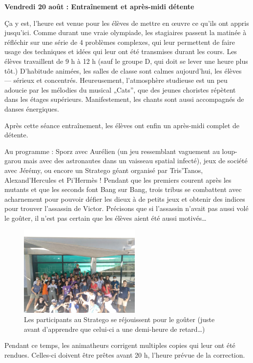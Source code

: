 \begin{center}
{\textbf{Vendredi 20 août : Entraînement et après-midi détente}}
\end{center}
\vspace{2mm}

Ça y est, l’heure est venue pour les élèves de mettre en œuvre ce qu’ils ont appris jusqu’ici. Comme durant une vraie olympiade, les stagiaires passent la matinée à réfléchir sur une série de 4 problèmes complexes, qui leur permettent de faire usage des techniques et idées qui leur ont été transmises durant les cours. Les élèves travaillent de 9 h à 12 h (sauf le groupe D, qui doit se lever une heure plus tôt.) D’habitude animées, les salles de classe sont calmes aujourd’hui, les élèves — sérieux et concentrés. Heureusement, l’atmosphère studieuse est un peu adoucie par les mélodies du musical „Cats”, que des jeunes choristes répètent dans les étages supérieurs. Manifestement, les chants sont aussi accompagnés de danses énergiques.

Après cette séance entraînement, les élèves ont enfin un après-midi complet de détente.

Au programme : Sporz avec Aurélien (un jeu ressemblant vaguement au loup-garou mais avec des astronautes dans un vaisseau spatial infecté), jeux de société avec Jérémy, ou encore un Stratego géant organisé par Tris’Tanos, Alexand’Hercules et Pi’Hermès ! Pendant que les premiers courent après les mutants et que les seconds font Bang sur Bang, trois tribus se combattent avec acharnement pour pouvoir défier les dieux à de petits jeux et obtenir des indices pour trouver l’assassin de Victor. Précisons que si l’assassin n’avait pas aussi volé le goûter, il n’est pas certain que les élèves aient été aussi motivés…

\begin{figure}[H]
\centering\includegraphics[width=6cm]{CR-20-0.jpg}
\caption{Les participants au Stratego se réjouissent pour le goûter (juste avant d’apprendre que celui-ci a une demi-heure de retard…)}
\end{figure}

Pendant ce temps, les animatheurs corrigent multiples copies qui leur ont été rendues. Celles-ci doivent être prêtes avant 20 h, l’heure prévue de la correction.